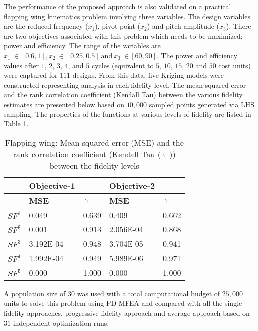 The performance of the proposed approach is also validated on a practical flapping wing kinematics problem involving three variables. The design variables are the reduced frequency ($x_1$), pivot point ($x_2$) and pitch amplitude ($x_3$). There are two objectives associated with this problem which needs to be maximized: power and efficiency. The range of the variables are $x_1~\in [0.6,1], x_2~\in [0.25,0.5]~\text{and}~x_3~\in [60,90]$. The power and efficiency values after $1$, $2$, $3$, $4$, and $5$ cycles (equivalent to $5$, $10$, $15$, $20$ and $50$ cost units) were captured for $111$ designs. From this data, five Kriging models were constructed representing analysis in each fidelity level. The mean squared error and the rank correlation coefficient (Kendall Tau) between the various fidelity estimates are presented below based on $10,000$ sampled points generated via LHS sampling. The properties of the functions at various levels of fidelity are listed in Table \ref{tab:mse_tau_flapping}.  

\begin{table}[!htb]\footnotesize
	\centering
	\caption{Flapping wing: Mean squared error (MSE) and the rank correlation coefficient (Kendall Tau ($\uptau$)) between the fidelity levels}
	\label{tab:mse_tau_flapping}
	\begin{tabular}{|l|l|l|l|l|}
		\noalign{\smallskip}\hline
		& \textbf{Objective-1} &                      & \textbf{Objective-2} &                      \\ \hline
		& \textbf{MSE}         & \textbf{$\uptau$} & \textbf{MSE}         & \textbf{$\uptau$} \\ \hline
		\textbf{$SF^1$} & 0.049           & 0.639               & 0.409           & 0.662               \\ \hline
		\textbf{$SF^2$} & 0.001           & 0.913              & 2.056E-04           & 0.868               \\ \hline
		\textbf{$SF^3$} & 3.192E-04           & 0.948               & 3.704E-05           & 0.941               \\ \hline
		\textbf{$SF^4$} & 1.992E-04           & 0.949               & 5.989E-06           & 0.971               \\ \hline
		\textbf{$SF^5$} & 0.000           & 1.000              & 0.000           & 1.000               \\ \hline
	\end{tabular}
\end{table}

A population size of $30$ was used with a total computational budget of $25,000$ units to solve this problem using PD-MFEA and compared with all the single fidelity approaches, progressive fidelity approach and average approach based on $31$ independent optimization runs.  

